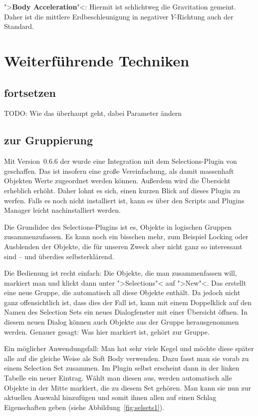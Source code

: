 \documentclass[10pt,DIV=14,a4paper]{scrartcl}
\begin{document}
	\item ">\textbf{Body Acceleration}"<: Hiermit ist schlichtweg die
	Gravitation gemeint. Daher ist die mittlere Erdbeschleunigung in
	negativer $Y$-Richtung auch der Standard.

\itE




\pagebreak
\section{Weiterführende Techniken}

\subsection{ fortsetzen}
TODO: Wie das überhaupt geht, dabei Parameter ändern

\subsection{ zur Gruppierung}
Mit Version~0.6.6 der \fluidsim wurde eine Integration mit dem
Selections-Plugin von \aoi geschaffen. Das ist insofern eine große
Vereinfachung, als damit massenhaft Objekten Werte zugeordnet werden
können. Außerdem wird die Übersicht erheblich erhöht. Daher lohnt es
sich, einen kurzen Blick auf dieses Plugin zu werfen. Falls es noch
nicht installiert ist, kann es über den Scripts and Plugins Manager
leicht nachinstalliert werden.

Die Grundidee des Selections-Plugins ist es, Objekte in logischen
Gruppen zusammenzufassen. Es kann noch ein bisschen mehr, zum Beispiel
Locking oder Ausblenden der Objekte, die für unseren Zweck aber nicht
ganz so interessant sind -- und überdies selbst\-er\-klä\-rend.

Die Bedienung ist recht einfach: Die Objekte, die man zusammenfassen
will, markiert man und klickt dann unter ">Selections"< auf ">New"<. Das
erstellt eine neue Gruppe, die automatisch all diese Objekte enthält. Da
jedoch nicht ganz offensichtlich ist, dass dies der Fall ist, kann mit
einem Doppelklick auf den Namen des Selection Sets ein neues
Dialogfenster mit einer Übersicht öffnen. In diesem neuen Dialog können
auch Objekte aus der Gruppe herausgenommen werden. Genauer gesagt: Was
hier markiert ist, gehört zur Gruppe.

Ein möglicher Anwendungsfall: Man hat sehr viele Kegel und möchte diese
später alle auf die gleiche Weise als Soft Body verwenden. Dazu fasst
man sie vorab zu einem Selection Set zusammen. Im Plugin selbst
erscheint dann in der linken Tabelle ein neuer Eintrag. Wählt man diesen
aus, werden automatisch alle Objekte in der Mitte markiert, die zu
diesem Set gehören. Man kann sie nun zur aktuellen Auswahl hinzufügen
und somit ihnen allen auf einen Schlag Eigenschaften geben (siehe
Abbildung~\ref{fig:selsets1}).
\end{document}
